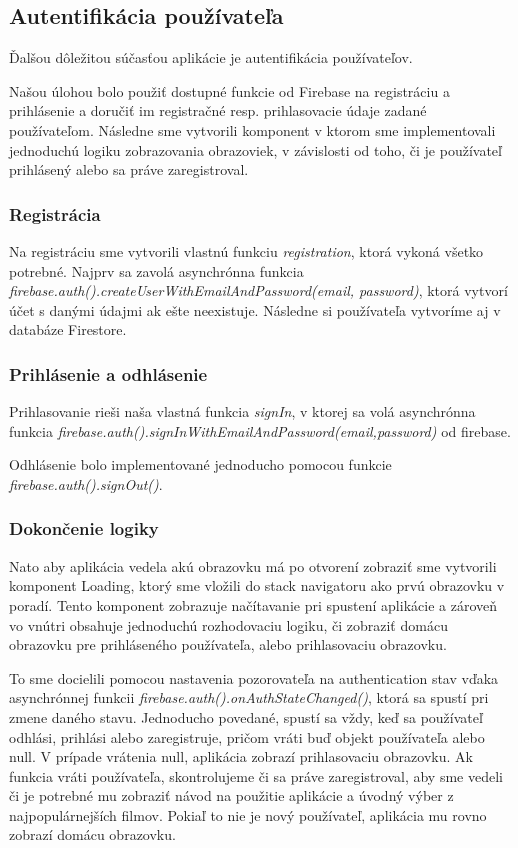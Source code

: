 \subsection{Autentifikácia používateľa}
Ďalšou dôležitou súčasťou aplikácie je autentifikácia používateľov.

Našou úlohou bolo použiť dostupné funkcie od Firebase na registráciu a prihlásenie a doručiť im registračné resp. prihlasovacie údaje zadané používateľom. Následne sme vytvorili komponent v ktorom sme implementovali jednoduchú logiku zobrazovania obrazoviek, v závislosti od toho, či je používateľ prihlásený alebo sa práve zaregistroval.
\subsubsection{Registrácia}
Na registráciu sme vytvorili vlastnú funkciu \textit{registration}, ktorá vykoná všetko potrebné. Najprv sa zavolá asynchrónna funkcia \textit{firebase.auth().createUserWithEmailAndPassword(email, password)}, ktorá vytvorí účet s danými údajmi ak ešte neexistuje. Následne si používateľa vytvoríme aj v databáze Firestore. 
\subsubsection{Prihlásenie a odhlásenie}
Prihlasovanie rieši naša vlastná funkcia \textit{signIn}, v ktorej sa volá asynchrónna funkcia \textit{firebase.auth().signInWithEmailAndPassword(email,password)} od firebase. 

Odhlásenie bolo implementované jednoducho pomocou funkcie \textit{firebase.auth().signOut()}.
\subsubsection{Dokončenie logiky}
Nato aby aplikácia vedela akú obrazovku má po otvorení zobraziť sme vytvorili komponent Loading, ktorý sme vložili do stack navigatoru ako prvú obrazovku v poradí. Tento komponent zobrazuje načítavanie pri spustení aplikácie a zároveň vo vnútri obsahuje jednoduchú rozhodovaciu logiku, či zobraziť domácu obrazovku pre prihláseného používateľa, alebo prihlasovaciu obrazovku. 

To sme docielili pomocou nastavenia pozorovateľa na authentication stav vďaka asynchrónnej funkcii \textit{firebase.auth().onAuthStateChanged()}, ktorá sa spustí pri zmene daného stavu. Jednoducho povedané, spustí sa vždy, keď sa používateľ odhlási, prihlási alebo zaregistruje, pričom vráti buď objekt používateľa alebo null. V prípade vrátenia null, aplikácia zobrazí prihlasovaciu obrazovku. Ak funkcia vráti používateľa, skontrolujeme či sa práve zaregistroval, aby sme vedeli či je potrebné mu zobraziť návod na použitie aplikácie a úvodný výber z najpopulárnejších filmov. Pokiaľ to nie je nový používateľ, aplikácia mu rovno zobrazí domácu obrazovku. 

